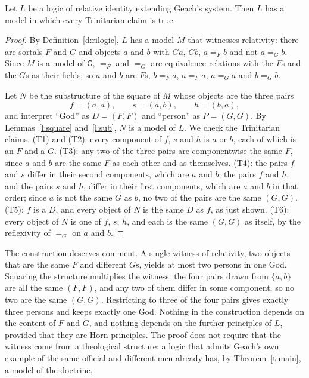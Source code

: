 \documentclass{situationist-preprint}
\begin{document}
\begin{theorem}\label{t:main}
Let $L$ be a logic of relative identity extending Geach's system. Then $L$ has a model in which every Trinitarian claim is true.
\end{theorem}

\begin{proof}
By Definition~\ref{d:rilogic}, $L$ has a model $M$ that witnesses relativity: there are sortals $F$ and $G$ and objects $a$ and $b$ with $G a$, $G b$, $a =_F b$ and not $a =_G b$. Since $M$ is a model of $\mathsf{G}$, $=_F$ and $=_G$ are equivalence relations with the $F$s and the $G$s as their fields; so $a$ and $b$ are $F$s, $b =_F a$, $a =_F a$, $a =_G a$ and $b =_G b$.

Let $N$ be the substructure of the square of $M$ whose objects are the three pairs
\[
f = (a, a), \qquad s = (a, b), \qquad h = (b, a),
\]
and interpret \enquote{God} as $D = (F, F)$ and \enquote{person} as $P = (G, G)$. By Lemmas~\ref{l:square} and~\ref{l:sub}, $N$ is a model of $L$. We check the Trinitarian claims. (T1) and (T2): every component of $f$, $s$ and $h$ is $a$ or $b$, each of which is an $F$ and a $G$. (T3): any two of the three pairs are componentwise the same $F$, since $a$ and $b$ are the same $F$ as each other and as themselves. (T4): the pairs $f$ and $s$ differ in their second components, which are $a$ and $b$; the pairs $f$ and $h$, and the pairs $s$ and $h$, differ in their first components, which are $a$ and $b$ in that order; since $a$ is not the same $G$ as $b$, no two of the pairs are the same $(G, G)$. (T5): $f$ is a $D$, and every object of $N$ is the same $D$ as $f$, as just shown. (T6): every object of $N$ is one of $f$, $s$, $h$, and each is the same $(G, G)$ as itself, by the reflexivity of $=_G$ on $a$ and $b$.
\end{proof}

The construction deserves comment. A single witness of relativity, two objects that are the same $F$ and different $G$s, yields at most two persons in one God. Squaring the structure multiplies the witness: the four pairs drawn from $\{a, b\}$ are all the same $(F, F)$, and any two of them differ in some component, so no two are the same $(G, G)$. Restricting to three of the four pairs gives exactly three persons and keeps exactly one God. Nothing in the construction depends on the content of $F$ and $G$, and nothing depends on the further principles of $L$, provided that they are Horn principles. The proof does not require that the witness come from a theological structure: a logic that admits Geach's own example of the same official and different men already has, by Theorem~\ref{t:main}, a model of the doctrine.
\end{document}
